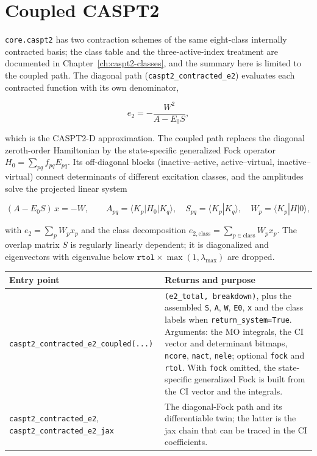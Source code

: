 \section{Coupled CASPT2}
\label{sec:new-caspt2-coupled}

\texttt{core.caspt2} has two contraction schemes of the same eight-class
internally contracted basis; the class table and the three-active-index
treatment are documented in Chapter~\ref{ch:caspt2-classes}, and the
summary here is limited to the coupled path.  The diagonal path
(\texttt{caspt2\_contracted\_e2}) evaluates each contracted function
with its own denominator,

\begin{equation}
  e_2 = -\frac{W^2}{A - E_0 S},
  \label{eq:new-caspt2-diagonal}
\end{equation}

which is the CASPT2-D approximation.  The coupled path replaces the
diagonal zeroth-order Hamiltonian by the state-specific generalized
Fock operator $H_0 = \sum_{pq} f_{pq} E_{pq}$.  Its off-diagonal blocks
(inactive--active, active--virtual, inactive--virtual) connect
determinants of different excitation classes, and the amplitudes solve
the projected linear system

\begin{equation}
  (A - E_0 S)\,x = -W, \qquad
  A_{pq} = \langle K_p | H_0 | K_q \rangle, \quad
  S_{pq} = \langle K_p | K_q \rangle, \quad
  W_p = \langle K_p | H | 0 \rangle,
  \label{eq:new-caspt2-coupled}
\end{equation}

with $e_2 = \sum_p W_p x_p$ and the class decomposition
$e_{2,\mathrm{class}} = \sum_{p \in \mathrm{class}} W_p x_p$.  The
overlap matrix $S$ is regularly linearly dependent; it is diagonalized
and eigenvectors with eigenvalue below
$\texttt{rtol} \times \max(1, \lambda_{\max})$ are dropped.

\begin{center}
\small
\begin{tabularx}{\textwidth}{>{\raggedright\arraybackslash}p{}>{\raggedright\arraybackslash}X}
\toprule
Entry point & Returns and purpose \\
\midrule
\texttt{caspt2\_contracted\_e2\_coupled(...)} &
  \texttt{(e2\_total, breakdown)}, plus the assembled \texttt{S},
  \texttt{A}, \texttt{W}, \texttt{E0}, \texttt{x} and the class labels
  when \texttt{return\_system=True}.  Arguments: the MO integrals, the
  CI vector and determinant bitmaps, \texttt{ncore}, \texttt{nact},
  \texttt{nele}; optional \texttt{fock} and \texttt{rtol}.  With
  \texttt{fock} omitted, the state-specific generalized Fock is built
  from the CI vector and the integrals. \\
\texttt{caspt2\_contracted\_e2}, \texttt{caspt2\_contracted\_e2\_jax} &
  The diagonal-Fock path and its differentiable twin; the latter is the
  jax chain that can be traced in the CI coefficients. \\
\bottomrule
\end{tabularx}
\end{center}

